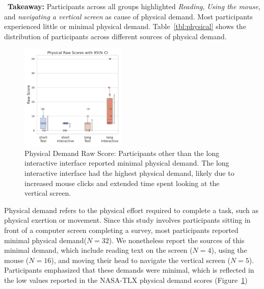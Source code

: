 \vspace{5pt}
\begin{tldrbox}
    \faInfoCircle~\xspace\textbf{Takeaway:} Participants across all groups highlighted \textit{Reading}, \textit{Using the mouse}, and \textit{navigating a vertical screen} as cause of physical demand. Most participants experienced little or minimal physical demand. Table~\ref{tbl:physical} shows the distribution of participants across different sources of physical demand.
\end{tldrbox}

\begin{figure} %
    \centering
    \includegraphics[width=0.45\textwidth, trim=0 13 0 13, clip]{content/image/cog/Physical_scores.pdf}
    \captionsetup{width=0.40\textwidth, justification=justified} %
    \caption{Physical Demand Raw Score: Participants other than the long interactive interface reported minimal physical demand. The long interactive interface had the highest physical demand, likely due to increased mouse clicks and extended time spent looking at the vertical screen.}
    \label{fig:physical_cog_score}
\end{figure}

Physical demand refers to the physical effort required to complete a task, such as physical exertion or movement. Since this study involves participants sitting in front of a computer screen completing a survey, most participants reported minimal physical demand($N=32$). We nonetheless report the sources of this minimal demand, which include reading text on the screen ($N=4$), using the mouse ($N=16$), and moving their head to navigate the vertical screen ($N=5$). Participants emphasized that these demands were minimal, which is reflected in the low values reported in the NASA-TLX physical demand scores (Figure~\ref{fig:physical_cog_score})

